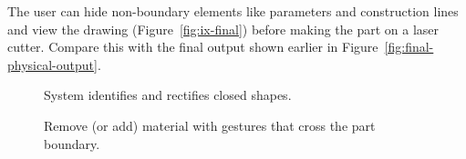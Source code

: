 \documentclass[11pt]{article}
\begin{document}
The user can hide non-boundary elements like parameters and
construction lines and view the drawing (Figure~\ref{fig:ix-final})
before making the part on a laser cutter. Compare this with the final
output shown earlier in Figure~\ref{fig:final-physical-output}.

\newpage
{}
\twocolumn

\begin{figure}[] 
\centering
{} 
\caption{System identifies and rectifies closed shapes.}
\label{fig:ix-draw-bounds}
\end{figure}

\begin{figure}[] 
\centering
{} 
\caption{Remove (or add) material with gestures that cross the part
  boundary.}
\label{fig:ix-remove-from-edge}
\end{figure}
\end{document}
